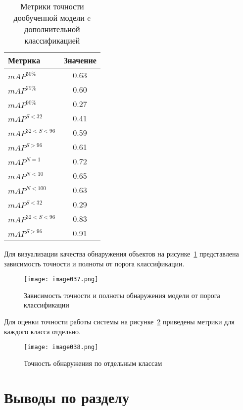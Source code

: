 \begin{table}[H]
	\def\arraystretch{1.3}
	\caption{Метрики точности дообученной модели c дополнительной классификацией}
	\begin{center}
		\begin{tabular}{|l|c|}
			\hline
			Метрика & Значение\\  \hline			
			\(mAP^{50\%}\) & 0.63\\ \hline			
			\(mAP^{75\%}\) & 0.60\\ \hline
			\(mAP^{90\%}\) & 0.27\\ \hline
			\(mAP^{S<32}\) & 0.41\\ \hline
			\(mAP^{32<S<96}\) & 0.59\\ \hline
			\(mAP^{S>96}\) & 0.61\\ \hline
			\(mAP^{N=1}\) & 0.72\\ \hline
			\(mAP^{N<10}\) & 0.65\\ \hline
			\(mAP^{N<100}\) & 0.63\\ \hline
			\(mAP^{S<32}\) & 0.29\\ \hline
			\(mAP^{32<S<96}\) & 0.83\\ \hline
			\(mAP^{S>96}\) & 0.91\\ \hline			
		\end{tabular}
		\label{tabular:tab_exp_4}
	\end{center}
\end{table}

Для визуализации качества обнаружения объектов на рисунке~\ref{fig:image037} представлена зависимость точности и полноты от порога классификации.

\begin{figure}[htbp]
\centering
\texttt{[image: image037.png]}
\caption{Зависимость точности и полноты обнаружения модели от порога классификации}%
\label{fig:image037}
\end{figure}

Для оценки точности работы системы на рисунке~\ref{fig:image038} приведены метрики для каждого класса отдельно.

\begin{figure}[htbp]
\centering
\texttt{[image: image038.png]}
\caption{Точность обнаружения по отдельным классам}%
\label{fig:image038}
\end{figure}

\section{Выводы по разделу}

